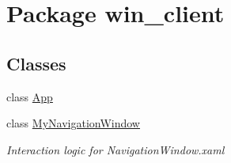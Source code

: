 \hypertarget{namespacewin__client}{\section{Package win\-\_\-client}
\label{namespacewin__client}
}
\subsection*{Classes}
\begin{DoxyCompactItemize}
\item 
class \hyperlink{classwin__client_1_1_app}{App}
\item 
class \hyperlink{classwin__client_1_1_my_navigation_window}{My\-Navigation\-Window}
\begin{DoxyCompactList}\small\item\em Interaction logic for Navigation\-Window.\-xaml \end{DoxyCompactList}\end{DoxyCompactItemize}
